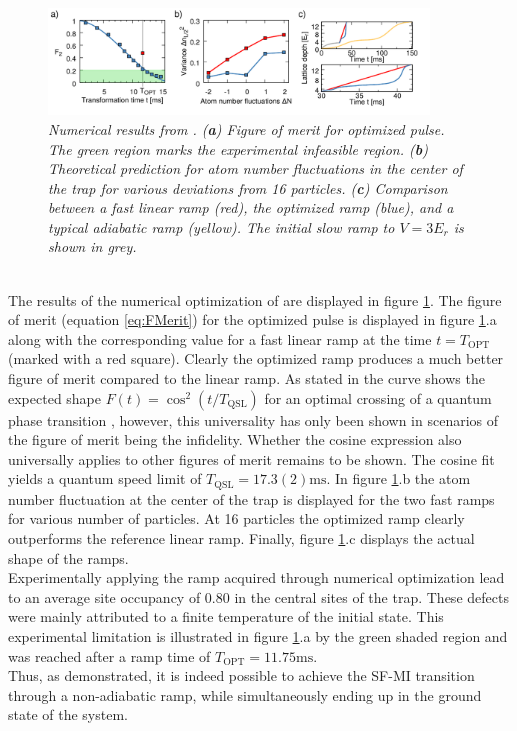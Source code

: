 \begin{figure}[h!]
	\centering
	\includegraphics[width=0.9\textwidth]{Figures/FrankRamp.pdf}
	\caption{\textit{Numerical results from \cite{FrankBloch}. (\textbf{a}) Figure of merit for optimized pulse. The green region marks the experimental infeasible region. (\textbf{b}) Theoretical prediction for atom number fluctuations in the center of the trap for various deviations from 16 particles. (\textbf{c}) Comparison between a fast linear ramp (red), the optimized ramp (blue), and a typical adiabatic ramp (yellow). The initial slow ramp to $V = 3 E_r$ is shown in grey.}}
	\label{fig:FrankRamp}
\end{figure}\\

The results of the numerical optimization of \cite{FrankBloch} are displayed in figure \ref{fig:FrankRamp}. The figure of merit (equation \ref{eq:FMerit}) for the optimized pulse is displayed in figure \ref{fig:FrankRamp}.a along with the corresponding value for a fast linear ramp at the time $t = T_{\mathrm{OPT}}$ (marked with a red square). Clearly the optimized ramp produces a much better figure of merit compared to the linear ramp. As stated in \cite{FrankBloch} the curve shows the expected shape $F(t)= \cos^2\left(t/T_{\mathrm{QSL}}\right)$ for an optimal crossing of a quantum phase transition \cite{Caneva2011}, however, this universality has only been shown in scenarios of the figure of merit being the infidelity. Whether the cosine expression also universally applies to other figures of merit remains to be shown. The cosine fit yields a quantum speed limit of $T_{\mathrm{QSL}} = 17.3(2) \mathrm{ms}$. In figure \ref{fig:FrankRamp}.b the atom number fluctuation at the center of the trap is displayed for the two fast ramps for various number of particles. At 16 particles the optimized ramp clearly outperforms the reference linear ramp. Finally, figure \ref{fig:FrankRamp}.c displays the actual shape of the ramps.\\

Experimentally applying the ramp acquired through numerical optimization lead to an average site occupancy of 0.80 in the central sites of the trap. These defects were mainly attributed to a finite temperature of the initial state. This experimental limitation is illustrated in figure \ref{fig:FrankRamp}.a by the green shaded region and was reached after a ramp time of $T_{\mathrm{OPT}} = 11.75 \mathrm{ms}$.\\
Thus, as \cite{FrankBloch} demonstrated, it is indeed possible to achieve the SF-MI transition through a non-adiabatic ramp, while simultaneously ending up in the ground state of the system.